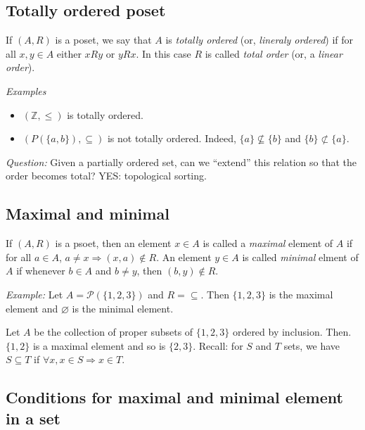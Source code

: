 \documentclass[11pt]{article}
\let\emptyset\varnothing
\begin{document}
    \subsection{Totally ordered poset}

    If \((A,R)\) is a poset, we say that $A$ is \emph{totally ordered} (or, \emph{lineraly ordered}) if for all \(x,y \in A\) either \(xRy\) or \(yRx\). In this case $R$ is called \emph{total order} (or, a \emph{linear order}).

    \vspace{1em}

    \emph{Examples}
    \begin{itemize}
        \item \((\mathbb{Z}, \leq)\) is totally ordered.
        \item \((P(\{a,b\}), \subseteq)\) is not totally ordered. Indeed, \(\{a\} \not\subseteq \{b\}\) and \(\{b\} \not\subset \{a\}\).
    \end{itemize}

    \emph{Question:} Given a partially ordered set, can we ``extend'' this relation so that the order becomes total? YES: topological sorting.

    \subsection{Maximal and minimal}

    If \((A,R)\) is a psoet, then an element \(x \in A\) is called a \emph{maximal} element of $A$ if for all \(a \in A\), \(a \neq x \Rightarrow (x,a)\notin R\). An element \(y \in A\) is called \emph{minimal} elment of $A$ if whenever \(b \in A\) and \(b \neq y\), then \((b,y)\notin R\).

    \vspace{1em}

    \emph{Example:} Let \(A = \mathcal{P}(\{1,2,3\})\) and \(R = \subseteq\). Then \(\{1,2,3\}\) is the maximal element and \(\emptyset\) is the minimal element.

    \vspace{1em}

    Let $A$ be the collection of proper subsets of \(\{1,2,3\}\) ordered by inclusion. Then. \(\{1,2\}\) is a maximal element and so is \(\{2,3\}\). Recall: for $S$ and $T$ sets, we have \(S \subseteq T\) if \(\forall x, x \in S \Rightarrow x \in T.\)

    \subsection{Conditions for maximal and minimal element in a set}
\end{document}
